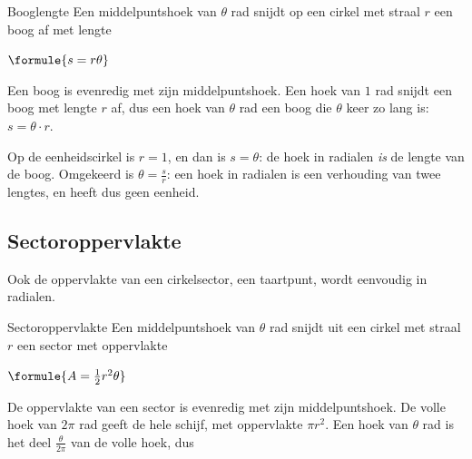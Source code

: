 \begin{theorie}
\begin{stelling}{Booglengte}
Een middelpuntshoek van $\theta$ rad snijdt op een cirkel met straal $r$ een boog af met lengte

\vspace{1mm}
\qquad $\formule{s = r\theta}$
\end{stelling}
\begin{bewijs}
Een boog is evenredig met zijn middelpuntshoek. Een hoek van $1$ rad snijdt een boog met lengte $r$ af, dus een hoek van $\theta$ rad een boog die $\theta$ keer zo lang is: $s = \theta \cdot r$.
\end{bewijs}
\end{theorie}

Op de eenheidscirkel is $r = 1$, en dan is $s = \theta$: de hoek in radialen \textit{is} de lengte van de boog. Omgekeerd is $\theta = \frac{s}{r}$: een hoek in radialen is een verhouding van twee lengtes, en heeft dus geen eenheid.


\begin{oefeningen}
\end{oefeningen}

\subsection{Sectoroppervlakte}

Ook de oppervlakte van een cirkelsector, een taartpunt, wordt eenvoudig in radialen.

\begin{theorie}
\begin{stelling}{Sectoroppervlakte}
Een middelpuntshoek van $\theta$ rad snijdt uit een cirkel met straal $r$ een sector met oppervlakte

\vspace{1mm}
\qquad $\formule{A = \tfrac12 r^2\theta}$
\end{stelling}
\begin{bewijs}
De oppervlakte van een sector is evenredig met zijn middelpuntshoek. De volle hoek van $2\pi$ rad geeft de hele schijf, met oppervlakte $\pi r^2$. Een hoek van $\theta$ rad is het deel $\frac{\theta}{2\pi}$ van de volle hoek, dus
\end{bewijs}
\end{theorie}

